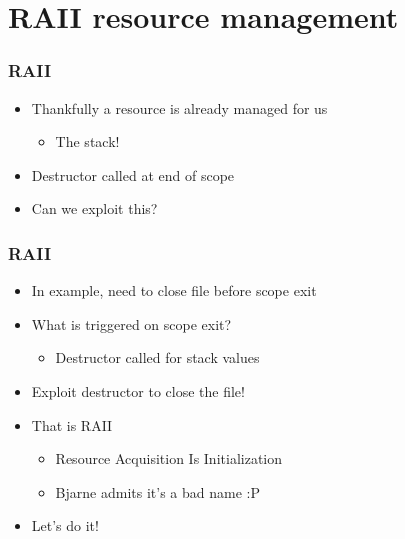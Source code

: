 


\section{RAII resource management}
\frame{\sectionpage}

\begin{frame}
    \frametitle{RAII}
    \begin{itemize}
        \item<1->Thankfully a resource is already managed for us
            \begin{itemize}
                \item<2->The stack!
            \end{itemize}
        \item<2->Destructor called at end of scope
        \item<2->Can we exploit this?
    \end{itemize}
\end{frame}

\begin{frame}
    \frametitle{RAII}
    \begin{itemize}
        \item In example, need to close file before scope exit
        \item What is triggered on scope exit?
            \begin{itemize}
                \item Destructor called for stack values
            \end{itemize}
        \item Exploit destructor to close the file!
        \item That is RAII
            \begin{itemize}
                \item Resource Acquisition Is Initialization
                \item Bjarne admits it's a bad name :P
            \end{itemize}
        \item Let's do it!
    \end{itemize}
\end{frame}

